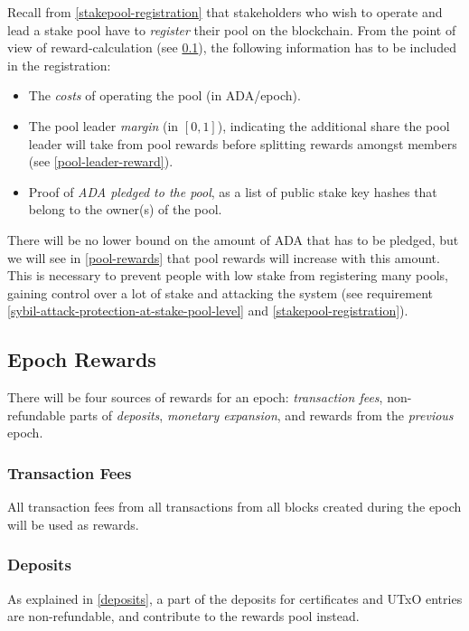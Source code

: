 \documentclass[11pt,a4paper]{article}
\begin{document}
Recall from \cref{stakepool-registration} that stakeholders
who wish to operate and lead a stake pool have to \emph{register} their
pool on the blockchain. From the point of view of reward-calculation
(see \cref{epoch-rewards}), the following information has to
be included in the registration:

\begin{itemize}
\item
  The \emph{costs} of operating the pool (in ADA/epoch).
\item
  The pool leader \emph{margin} (in \([0,1]\)), indicating the
  additional share the pool leader will take from pool rewards before
  splitting rewards amongst members (see
  \cref{pool-leader-reward}).
\item
  Proof of \emph{ADA pledged to the pool}, as a list of public stake
  key hashes that belong to the owner(s) of the pool.
\end{itemize}

There will be no lower bound on the amount of ADA that has to be
pledged, but we will see in \cref{pool-rewards} that pool
rewards will increase with this amount. This is necessary to prevent
people with low stake from registering many pools, gaining control over
a lot of stake and attacking the system (see requirement
\ref{sybil-attack-protection-at-stake-pool-level} and \cref{stakepool-registration}).

\subsection{Epoch Rewards}
\label{epoch-rewards}

There will be four sources of rewards for an epoch: \emph{transaction
  fees}, non-refundable parts of \emph{deposits}, \emph{monetary
  expansion}, and rewards from the \emph{previous} epoch.

\subsubsection{Transaction Fees}
\label{transaction-fees-1}

All transaction fees from all transactions from all blocks created
during the epoch will be used as rewards.

\subsubsection{Deposits}
\label{deposits-1}

As explained in \cref{deposits}, a part of the deposits for
certificates and UTxO entries are non-refundable, and contribute to
the rewards pool instead.
\end{document}
